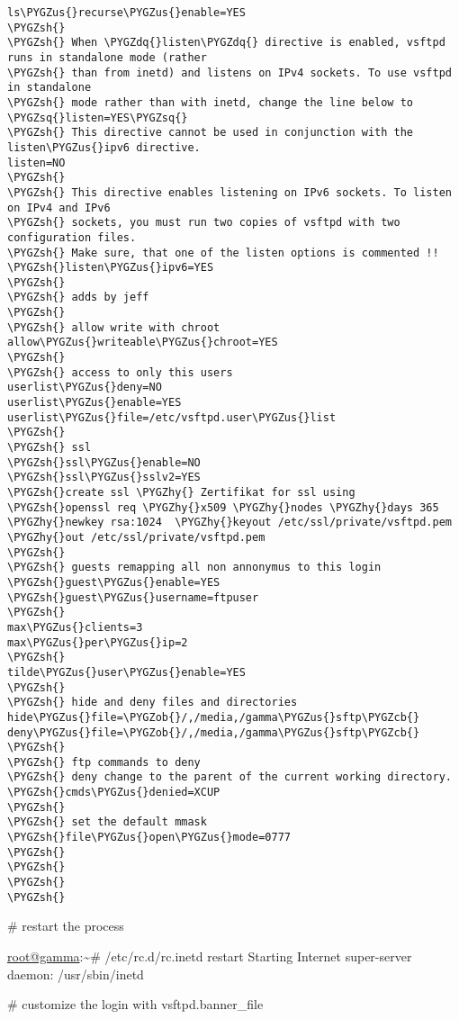\documentclass[letterpaper,10pt,english]{sphinxmanual}
\def\PYGZus{\char`\_}
\def\PYGZob{\char`\{}
\def\PYGZcb{\char`\}}
\def\PYGZsh{\char`\#}
\def\PYGZhy{\char`\-}
\def\PYGZsq{\char`\'}
\def\PYGZdq{\char`\"}
\begin{document}
\begin{Verbatim}[commandchars=\\\{\}]
ls\PYGZus{}recurse\PYGZus{}enable=YES
\PYGZsh{}
\PYGZsh{} When \PYGZdq{}listen\PYGZdq{} directive is enabled, vsftpd runs in standalone mode (rather
\PYGZsh{} than from inetd) and listens on IPv4 sockets. To use vsftpd in standalone
\PYGZsh{} mode rather than with inetd, change the line below to \PYGZsq{}listen=YES\PYGZsq{}
\PYGZsh{} This directive cannot be used in conjunction with the listen\PYGZus{}ipv6 directive.
listen=NO
\PYGZsh{}
\PYGZsh{} This directive enables listening on IPv6 sockets. To listen on IPv4 and IPv6
\PYGZsh{} sockets, you must run two copies of vsftpd with two configuration files.
\PYGZsh{} Make sure, that one of the listen options is commented !!
\PYGZsh{}listen\PYGZus{}ipv6=YES
\PYGZsh{}
\PYGZsh{} adds by jeff
\PYGZsh{}
\PYGZsh{} allow write with chroot
allow\PYGZus{}writeable\PYGZus{}chroot=YES
\PYGZsh{}
\PYGZsh{} access to only this users
userlist\PYGZus{}deny=NO
userlist\PYGZus{}enable=YES
userlist\PYGZus{}file=/etc/vsftpd.user\PYGZus{}list
\PYGZsh{}
\PYGZsh{} ssl
\PYGZsh{}ssl\PYGZus{}enable=NO
\PYGZsh{}ssl\PYGZus{}sslv2=YES
\PYGZsh{}create ssl \PYGZhy{} Zertifikat for ssl using
\PYGZsh{}openssl req \PYGZhy{}x509 \PYGZhy{}nodes \PYGZhy{}days 365 \PYGZhy{}newkey rsa:1024  \PYGZhy{}keyout /etc/ssl/private/vsftpd.pem \PYGZhy{}out /etc/ssl/private/vsftpd.pem
\PYGZsh{}
\PYGZsh{} guests remapping all non annonymus to this login
\PYGZsh{}guest\PYGZus{}enable=YES
\PYGZsh{}guest\PYGZus{}username=ftpuser
\PYGZsh{}
max\PYGZus{}clients=3
max\PYGZus{}per\PYGZus{}ip=2
\PYGZsh{}
tilde\PYGZus{}user\PYGZus{}enable=YES
\PYGZsh{}
\PYGZsh{} hide and deny files and directories
hide\PYGZus{}file=\PYGZob{}/,/media,/gamma\PYGZus{}sftp\PYGZcb{} 
deny\PYGZus{}file=\PYGZob{}/,/media,/gamma\PYGZus{}sftp\PYGZcb{} 
\PYGZsh{}
\PYGZsh{} ftp commands to deny 
\PYGZsh{} deny change to the parent of the current working directory.
\PYGZsh{}cmds\PYGZus{}denied=XCUP
\PYGZsh{}
\PYGZsh{} set the default mmask
\PYGZsh{}file\PYGZus{}open\PYGZus{}mode=0777
\PYGZsh{}
\PYGZsh{}
\PYGZsh{}
\PYGZsh{}
\end{Verbatim}

\# restart the process

\href{mailto:root@gamma}{root@gamma}:\textasciitilde{}\# /etc/rc.d/rc.inetd restart
Starting Internet super-server daemon:  /usr/sbin/inetd

\# customize the login with vsftpd.banner\_file
\end{document}
